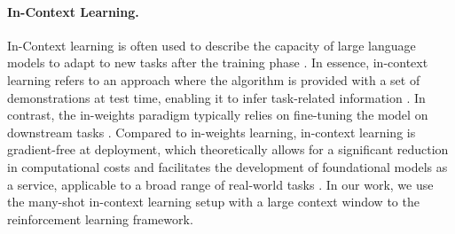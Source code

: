 \documentclass{article}
\theoremstyle{plain}
\theoremstyle{definition}
\theoremstyle{remark}
\begin{document}
\paragraph{In-Context Learning.} In-Context learning is often used to describe the capacity of large language models to adapt to new tasks after the training phase \cite{brown2020languagemodelsfewshotlearners, DBLP:journals/corr/abs-2107-13586}. In essence, in-context learning refers to an approach where the algorithm is provided with a set of demonstrations at test time, enabling it to infer task-related information \cite{min2022rethinkingroledemonstrationsmakes}. In contrast, the in-weights paradigm typically relies on fine-tuning the model on downstream tasks \cite{finn2017modelagnosticmetalearningfastadaptation, wang2024scalingproprioceptivevisuallearningheterogeneous, ying2024peac}. Compared to in-weights learning, in-context learning is gradient-free at deployment, which theoretically allows for a significant reduction in computational costs and facilitates the development of foundational models as a service, applicable to a broad range of real-world tasks \cite{DBLP:journals/corr/abs-2201-03514, dong2024surveyincontextlearning}. In our work, we use the many-shot in-context learning setup \cite{agarwal2024manyshotincontextlearning} with a large context window to the reinforcement learning framework. 
\end{document}
